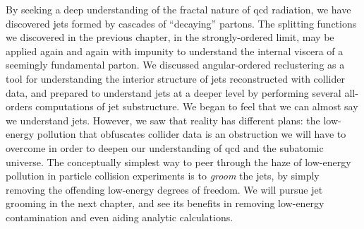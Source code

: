 By seeking a deep understanding of the fractal nature of \gls{qcd} radiation, we have discovered jets formed by cascades of ``decaying'' partons.
%
The splitting functions we discovered in the previous chapter, in the strongly-ordered limit, may be applied again and again with impunity to understand the internal viscera of a seemingly fundamental parton.
%
We discussed angular-ordered \gls{reclustering} as a tool for understanding the interior structure of jets reconstructed with collider data, and prepared to understand jets at a deeper level by performing several all-orders computations of jet substructure.
%
We began to feel that we can almost say we understand jets.
%
However, we saw that reality has different plans:
%
the low-energy pollution that obfuscates collider data is an obstruction we will have to overcome in order to deepen our understanding of \gls{qcd} and the subatomic universe.
%
The conceptually simplest way to peer through the haze of low-energy pollution in particle collision experiments is to \textit{groom} the jets, by simply removing the offending low-energy degrees of freedom.
%
We will pursue jet grooming in the next chapter, and see its benefits in removing low-energy contamination and even aiding analytic calculations.



